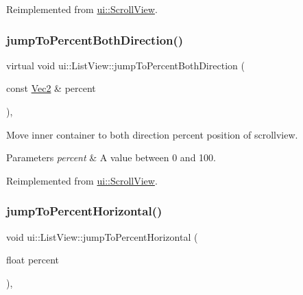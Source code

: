 Reimplemented from \hyperlink{classui_1_1ScrollView_a288c35e8d899c4455f5574099fc17d1d}{ui\+::\+Scroll\+View}.

\mbox{\label{classui_1_1ListView_ad6bbe89fde987d1bb2ead8de0bc688b5}} 
\subsubsection{\texorpdfstring{jump\+To\+Percent\+Both\+Direction()}{jumpToPercentBothDirection()}\hspace{0.1cm}{\footnotesize\ttfamily [2/2]}}
{\footnotesize\ttfamily virtual void ui\+::\+List\+View\+::jump\+To\+Percent\+Both\+Direction (\begin{DoxyParamCaption}\item[{const \hyperlink{classVec2}{Vec2} \&}]{percent }\end{DoxyParamCaption})\hspace{0.3cm}{\ttfamily [override]}, {\ttfamily [virtual]}}

Move inner container to both direction percent position of scrollview. 
\begin{DoxyParams}{Parameters}
{\em percent} & A value between 0 and 100. \\
\hline
\end{DoxyParams}


Reimplemented from \hyperlink{classui_1_1ScrollView_a288c35e8d899c4455f5574099fc17d1d}{ui\+::\+Scroll\+View}.

\mbox{\label{classui_1_1ListView_a770ffffaa274cc0bd86828910586632d}} 
\subsubsection{\texorpdfstring{jump\+To\+Percent\+Horizontal()}{jumpToPercentHorizontal()}\hspace{0.1cm}{\footnotesize\ttfamily [1/2]}}
{\footnotesize\ttfamily void ui\+::\+List\+View\+::jump\+To\+Percent\+Horizontal (\begin{DoxyParamCaption}\item[{float}]{percent }\end{DoxyParamCaption})\hspace{0.3cm}{\ttfamily [override]}, {\ttfamily [virtual]}}

